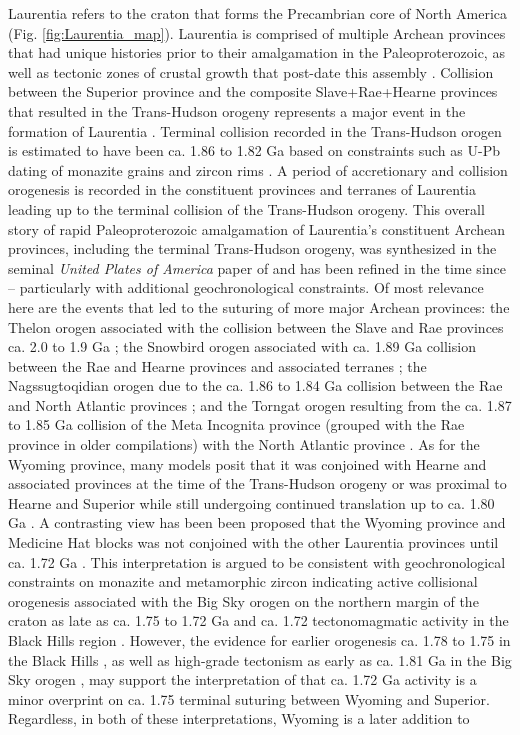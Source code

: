 \documentclass[11pt,letterpaper]{article}
\begin{document}
Laurentia refers to the craton that forms the Precambrian core of North America (Fig. \ref{fig:Laurentia_map}). Laurentia is comprised of multiple Archean provinces that had unique histories prior to their amalgamation in the Paleoproterozoic, as well as tectonic zones of crustal growth that post-date this assembly \citep{Hoffman1989a, Whitmeyer2007a}. Collision between the Superior province and the composite Slave+Rae+Hearne provinces that resulted in the Trans-Hudson orogeny represents a major event in the formation of Laurentia \citep{Corrigan2009a}. Terminal collision recorded in the Trans-Hudson orogen is estimated to have been ca. 1.86 to 1.82 Ga based on constraints such as U-Pb dating of monazite grains and zircon rims \citep[e.g.]{Skipton2016a, Weller2017a}. A period of accretionary and collision orogenesis is recorded in the constituent provinces and terranes of Laurentia leading up to the terminal collision of the Trans-Hudson orogeny. This overall story of rapid Paleoproterozoic amalgamation of Laurentia's constituent Archean provinces, including the terminal Trans-Hudson orogeny, was synthesized in the seminal \textit{United Plates of America} paper of \citet{Hoffman1988a} and has been refined in the time since -- particularly with additional geochronological constraints. Of most relevance here are the events that led to the suturing of more major Archean provinces: the Thelon orogen associated with the collision between the Slave and Rae provinces ca. 2.0 to 1.9 Ga \citep{Hoffman1989a}; the Snowbird orogen associated with ca. 1.89 Ga collision between the Rae and Hearne provinces and associated terranes \citep{Berman2007a}; the Nagssugtoqidian orogen due to the ca. 1.86 to 1.84 Ga collision between the Rae and North Atlantic provinces \citep{St-Onge2009a}; and the Torngat orogen resulting from the ca. 1.87 to 1.85 Ga collision of the Meta Incognita province (grouped with the Rae province in older compilations) with the North Atlantic province \citep{St-Onge2009a}. As for the Wyoming province, many models posit that it was conjoined with Hearne and associated provinces at the time of the Trans-Hudson orogeny \citep[e.g.][]{St-Onge2009a, Pehrsson2015a} or was proximal to Hearne and Superior while still undergoing continued translation up to ca. 1.80 Ga \citep{Whitmeyer2007a}. A contrasting view has been been proposed that the Wyoming province and Medicine Hat blocks was not conjoined with the other Laurentia provinces until ca. 1.72 Ga \citep{Kilian2016b}. This interpretation is argued to be consistent with geochronological constraints on monazite and metamorphic zircon indicating active collisional orogenesis associated with the Big Sky orogen on the northern margin of the craton as late as ca. 1.75 to 1.72 Ga \citep{Condit2015a} and ca. 1.72 tectonomagmatic activity in the Black Hills region \citep{Redden1990a}. However, the evidence for earlier orogenesis ca. 1.78 to 1.75 in the Black Hills \citep{Dahl1999a,Hrncir2017a}, as well as high-grade tectonism as early as ca. 1.81 Ga in the Big Sky orogen \citep{Condit2015a}, may support the interpretation of \citet{Hrncir2017a} that ca. 1.72 Ga activity is a minor overprint on ca. 1.75 terminal suturing between Wyoming and Superior. Regardless, in both of these interpretations, Wyoming is a later addition to 
\end{document}
